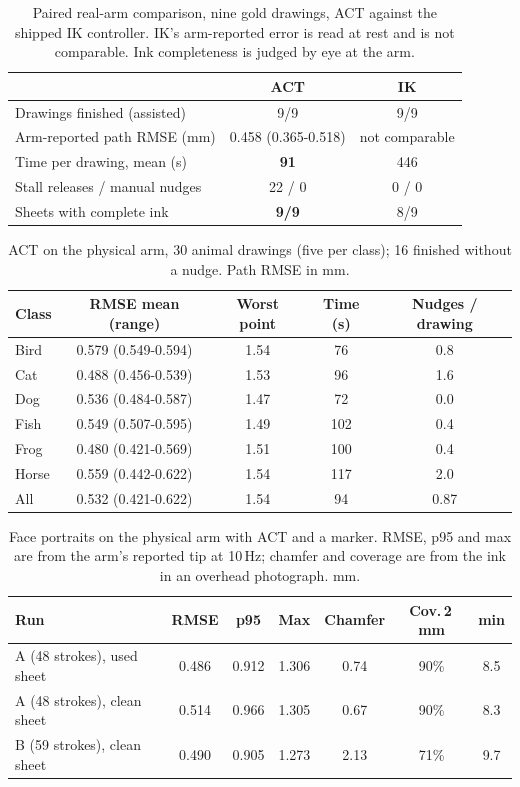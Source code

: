 \documentclass[conference]{IEEEtran}
\begin{document}
\begin{table}[t]
\centering
\caption{Paired real-arm comparison, nine gold drawings, ACT against the shipped IK controller. IK's
arm-reported error is read at rest and is not comparable. Ink completeness is judged by eye at the arm.}
\label{tab:paired}
\setlength{\tabcolsep}{5pt}
\begin{tabular}{lcc}
\toprule
 & ACT & IK \\
\midrule
Drawings finished (assisted) & 9/9 & 9/9 \\
Arm-reported path RMSE (mm) & 0.458 (0.365-0.518) & not comparable \\
Time per drawing, mean (s) & \textbf{91} & 446 \\
Stall releases / manual nudges & 22 / 0 & 0 / 0 \\
Sheets with complete ink & \textbf{9/9} & 8/9 \\
\bottomrule
\end{tabular}
\end{table}

\begin{table}[t]
\centering
\caption{ACT on the physical arm, 30 animal drawings (five per class); 16 finished without a nudge. Path RMSE in mm.}
\label{tab:realclass}
\setlength{\tabcolsep}{3pt}
\begin{tabular}{lcccc}
\toprule
Class & RMSE mean (range) & Worst point & Time (s) & Nudges / drawing \\
\midrule
Bird  & 0.579 (0.549-0.594) & 1.54 & 76  & 0.8 \\
Cat   & 0.488 (0.456-0.539) & 1.53 & 96  & 1.6 \\
Dog   & 0.536 (0.484-0.587) & 1.47 & 72  & 0.0 \\
Fish  & 0.549 (0.507-0.595) & 1.49 & 102 & 0.4 \\
Frog  & 0.480 (0.421-0.569) & 1.51 & 100 & 0.4 \\
Horse & 0.559 (0.442-0.622) & 1.54 & 117 & 2.0 \\
\midrule
All   & 0.532 (0.421-0.622) & 1.54 & 94  & 0.87 \\
\bottomrule
\end{tabular}
\end{table}

\begin{table}[t]
\centering
\caption{Face portraits on the physical arm with ACT and a marker. RMSE, p95 and max are from the arm's reported
tip at 10\,Hz; chamfer and coverage are from the ink in an overhead photograph. mm.}
\label{tab:real}
\setlength{\tabcolsep}{2.2pt}
\begin{tabular}{lcccccc}
\toprule
Run & RMSE & p95 & Max & Chamfer & Cov.\,2\,mm & min \\
\midrule
A (48 strokes), used sheet  & 0.486 & 0.912 & 1.306 & 0.74 & 90\% & 8.5 \\
A (48 strokes), clean sheet & 0.514 & 0.966 & 1.305 & 0.67 & 90\% & 8.3 \\
B (59 strokes), clean sheet & 0.490 & 0.905 & 1.273 & 2.13 & 71\% & 9.7 \\
\bottomrule
\end{tabular}
\end{table}
\end{document}
